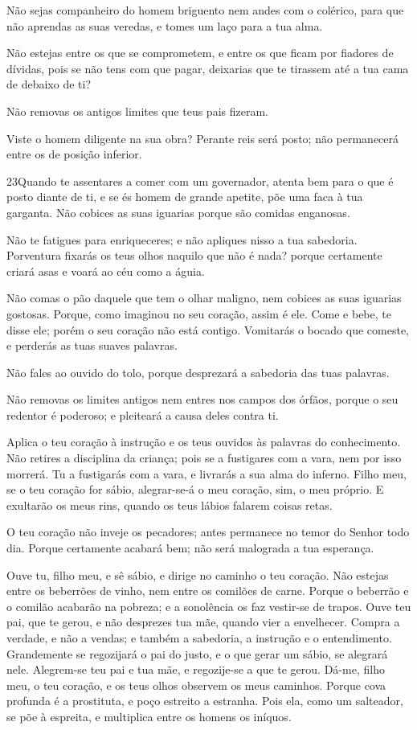 Não sejas companheiro do homem briguento nem andes com o
colérico, para que não aprendas as suas veredas, e tomes um
laço para a tua alma.

Não estejas entre os que se comprometem, e entre os que ficam por
fiadores de dívidas, pois se não tens com que pagar,
deixarias que te tirassem até a tua cama de debaixo de ti?

Não removas os antigos limites que teus pais fizeram.

Viste o homem diligente na sua obra? Perante reis será posto; não
permanecerá entre os de posição inferior.

\medskip

\lettrine{23}{}Quando te assentares a comer com um governador,
atenta bem para o que é posto diante de ti, e se és homem de
grande apetite, põe uma faca à tua garganta. Não cobices as suas
iguarias porque são comidas enganosas.

Não te fatigues para enriqueceres; e não apliques nisso a tua
sabedoria. Porventura fixarás os teus olhos naquilo que não é
nada? porque certamente criará asas e voará ao céu como a águia.

Não comas o pão daquele que tem o olhar maligno, nem cobices as
suas iguarias gostosas. Porque, como imaginou no seu coração,
assim é ele. Come e bebe, te disse ele; porém o seu coração não está
contigo. Vomitarás o bocado que comeste, e perderás as tuas
suaves palavras.

Não fales ao ouvido do tolo, porque desprezará a sabedoria das
tuas palavras.

Não removas os limites antigos nem entres nos campos dos órfãos,
porque o seu redentor é poderoso; e pleiteará a causa deles
contra ti.

Aplica o teu coração à instrução e os teus ouvidos às palavras do
conhecimento. Não retires a disciplina da criança; pois se a
fustigares com a vara, nem por isso morrerá. Tu a fustigarás
com a vara, e livrarás a sua alma do inferno. Filho meu, se o
teu coração for sábio, alegrar-se-á o meu coração, sim, o meu
próprio. E exultarão os meus rins, quando os teus lábios
falarem coisas retas.

O teu coração não inveje os pecadores; antes permanece no temor
do Senhor todo dia. Porque certamente acabará bem; não será
malograda a tua esperança.

Ouve tu, filho meu, e sê sábio, e dirige no caminho o teu
coração. Não estejas entre os beberrões de vinho, nem entre
os comilões de carne. Porque o beberrão e o comilão acabarão
na pobreza; e a sonolência os faz vestir-se de trapos. Ouve
teu pai, que te gerou, e não desprezes tua mãe, quando vier a
envelhecer. Compra a verdade, e não a vendas; e também a
sabedoria, a instrução e o entendimento. Grandemente se
regozijará o pai do justo, e o que gerar um sábio, se alegrará nele.
Alegrem-se teu pai e tua mãe, e regozije-se a que te gerou.
Dá-me, filho meu, o teu coração, e os teus olhos observem os
meus caminhos. Porque cova profunda é a prostituta, e poço
estreito a estranha. Pois ela, como um salteador, se põe à
espreita, e multiplica entre os homens os iníquos.

